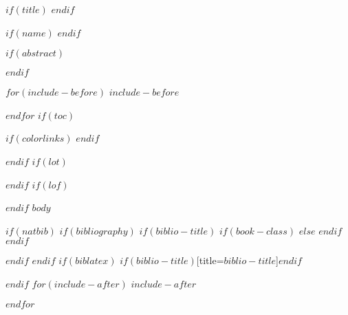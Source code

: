 \documentclass[11pt]{scrartcl}
\newcommand*{\TitleFont}{%
      \fontsize{16}{12}%
      \selectfont
      \centering}
\newcommand*{\AuthFont}{%
      \fontsize{14}{12}%
      \selectfont
      \centering}
\begin{document}
\begin{center}
$if(title)$
  \vspace{-4ex}
  \TitleFont{
  $title$
  }
$endif$


$if(name)$
  \AuthFont{
  $name$
  }
  \vspace{-.5ex}
$endif$

\end{center}

$if(abstract)$
\begin{abstract}
$abstract$
\end{abstract}
\newpage
$endif$

$for(include-before)$
$include-before$

$endfor$
$if(toc)$
{
$if(colorlinks)$
\hypersetup{linkcolor=$if(toccolor)$$toccolor$$else$black$endif$}
$endif$
\setcounter{tocdepth}{$toc-depth$}
\tableofcontents
{}
\setcounter{page}{0}
}
\newpage

$endif$
$if(lot)$
\listoftables
$endif$
$if(lof)$
\listoffigures
$endif$
$body$

$if(natbib)$
$if(bibliography)$
$if(biblio-title)$
$if(book-class)$
\renewcommand\bibname{$biblio-title$}
$else$
\renewcommand\refname{$biblio-title$}
$endif$
$endif$


$endif$
$endif$
$if(biblatex)$
\printbibliography$if(biblio-title)$[title=$biblio-title$]$endif$

$endif$
$for(include-after)$
$include-after$

$endfor$
\end{document}
